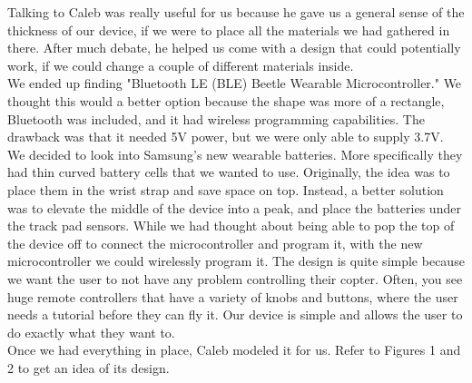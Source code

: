 \documentclass[12pt,letterpaper]{article}
\begin{document}
\hspace{1cm}Talking to Caleb was really useful for us because he gave us a general sense of the thickness of our device, if we were to place all the materials we had gathered in there. After much debate, he helped us come with a design that could potentially work, if we could change a couple of different materials inside.\\
\hspace{1cm}We ended up finding "Bluetooth LE (BLE) Beetle Wearable Microcontroller." We thought this would a better option because the shape was more of a rectangle, Bluetooth was included, and it had wireless programming capabilities. The drawback was that it needed 5V power, but we were only able to supply 3.7V. We decided to look into Samsung's new wearable batteries. More specifically they had thin curved battery cells that we wanted to use. Originally, the idea was to place them in the wrist strap and save space on top. Instead, a better solution was to elevate the middle of the device into a peak, and place the batteries under the track pad sensors. While we had thought about being able to pop the top of the device off to connect the microcontroller and program it, with the new microcontroller we could wirelessly program it. The design is quite simple because we want the user to not have any problem controlling their copter. Often, you see huge remote controllers that have a variety of knobs and buttons, where the user needs a tutorial before they can fly it. Our device is simple and allows the user to do exactly what they want to.\\
Once we had everything in place, Caleb modeled it for us. Refer to Figures 1 and 2 to get an idea of its design.
\end{document}
